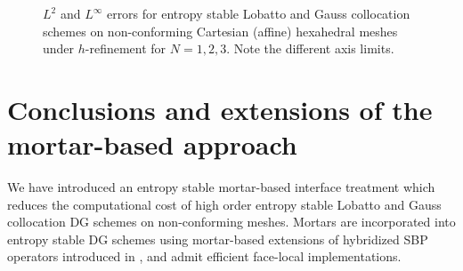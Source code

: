 \documentclass{svjour3}                     %
\renewcommand{\tilde}{\widetilde}
\newcommand{\LRp}[1]{\left( #1 \right)}
\renewcommand{\note}[1]{{\color{blue}{#1}}}
\begin{document}
\begin{figure}
{
}
\caption{$L^2$ and $L^\infty$ errors for entropy stable Lobatto and Gauss collocation schemes on non-conforming Cartesian (affine) hexahedral meshes under $h$-refinement for $N=1,2,3$.  Note the different axis limits.}
\label{fig:3d_affine}
\end{figure}


\note{TODO: add curved results and results using two-layer mortars.}

\section{Conclusions and extensions of the mortar-based approach}

We have introduced an entropy stable mortar-based interface treatment which reduces the computational cost of high order entropy stable Lobatto and Gauss collocation DG schemes on non-conforming meshes.  Mortars are incorporated into entropy stable DG schemes using mortar-based extensions of hybridized SBP operators introduced in \cite{chan2018discretely, chan2018efficient, chan2019skew}, and admit efficient face-local implementations.  
\end{document}
